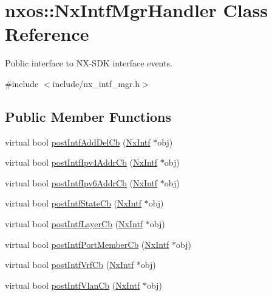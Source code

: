 \hypertarget{classnxos_1_1_nx_intf_mgr_handler}{}\section{nxos\+:\+:Nx\+Intf\+Mgr\+Handler Class Reference}
\label{classnxos_1_1_nx_intf_mgr_handler}


Public interface to N\+X-\/\+S\+DK interface events.  




{\ttfamily \#include $<$include/nx\+\_\+intf\+\_\+mgr.\+h$>$}

\subsection*{Public Member Functions}
\begin{DoxyCompactItemize}
\item 
virtual bool \mbox{\hyperlink{classnxos_1_1_nx_intf_mgr_handler_afe79bff5ee5b314111e2ce7c7226e73f}{post\+Intf\+Add\+Del\+Cb}} (\mbox{\hyperlink{classnxos_1_1_nx_intf}{Nx\+Intf}} $\ast$obj)
\item 
virtual bool \mbox{\hyperlink{classnxos_1_1_nx_intf_mgr_handler_a8f96e0a3a70f5f566b8f0f5928bf5e64}{post\+Intf\+Ipv4\+Addr\+Cb}} (\mbox{\hyperlink{classnxos_1_1_nx_intf}{Nx\+Intf}} $\ast$obj)
\item 
virtual bool \mbox{\hyperlink{classnxos_1_1_nx_intf_mgr_handler_ad845ed26b457bc0bdc7a9c79a94acdaf}{post\+Intf\+Ipv6\+Addr\+Cb}} (\mbox{\hyperlink{classnxos_1_1_nx_intf}{Nx\+Intf}} $\ast$obj)
\item 
virtual bool \mbox{\hyperlink{classnxos_1_1_nx_intf_mgr_handler_a9c3d4d357b1f0ab07558b4611c693755}{post\+Intf\+State\+Cb}} (\mbox{\hyperlink{classnxos_1_1_nx_intf}{Nx\+Intf}} $\ast$obj)
\item 
virtual bool \mbox{\hyperlink{classnxos_1_1_nx_intf_mgr_handler_aca73f02d8ce050cb1bb44fddc6338f76}{post\+Intf\+Layer\+Cb}} (\mbox{\hyperlink{classnxos_1_1_nx_intf}{Nx\+Intf}} $\ast$obj)
\item 
virtual bool \mbox{\hyperlink{classnxos_1_1_nx_intf_mgr_handler_ae3a76ba4fb97b941d9f11e9210d89a94}{post\+Intf\+Port\+Member\+Cb}} (\mbox{\hyperlink{classnxos_1_1_nx_intf}{Nx\+Intf}} $\ast$obj)
\item 
virtual bool \mbox{\hyperlink{classnxos_1_1_nx_intf_mgr_handler_aa6f8bc5b1cfa6d99e863c8ede3cafa5f}{post\+Intf\+Vrf\+Cb}} (\mbox{\hyperlink{classnxos_1_1_nx_intf}{Nx\+Intf}} $\ast$obj)
\item 
virtual bool \mbox{\hyperlink{classnxos_1_1_nx_intf_mgr_handler_aad14cab2e803ceadef82870303db526c}{post\+Intf\+Vlan\+Cb}} (\mbox{\hyperlink{classnxos_1_1_nx_intf}{Nx\+Intf}} $\ast$obj)
\end{DoxyCompactItemize}


